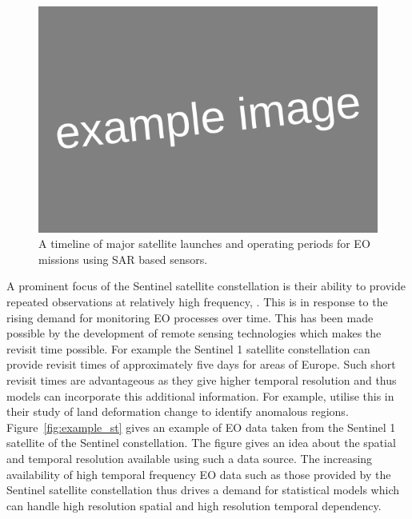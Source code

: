 \begin{figure}[htbp!] 
	\centering    
	\includegraphics[width=1.0\textwidth]{Example_image}
	\caption[Timeline of major EO satellites]{A timeline of major satellite launches and operating periods for EO missions using SAR based sensors.}
	\label{fig:sar_timeline}
\end{figure}

A prominent focus of the Sentinel satellite constellation is their ability to provide repeated observations at relatively high frequency, \cite{aschbacher_european_2012}. This is in response to the rising demand for monitoring EO processes over time.  This has been made possible by the development of remote sensing technologies which makes the revisit time possible. For example the Sentinel 1 satellite constellation can provide revisit times of approximately five days for areas of Europe. Such short revisit times are advantageous as they give higher temporal resolution and thus models can incorporate this additional information. For example, \citeauthor{raspini_continuous_2018} utilise this in their study of land deformation change to identify anomalous regions.  Figure~\ref{fig:example_st} gives an example of EO data taken from the Sentinel 1 satellite of the Sentinel constellation. The figure gives an idea about the spatial and temporal resolution available using such a data source. The increasing availability of high temporal frequency EO data such as those provided by the Sentinel satellite constellation thus drives a demand for statistical models which can handle high resolution spatial and high resolution temporal  dependency.  

